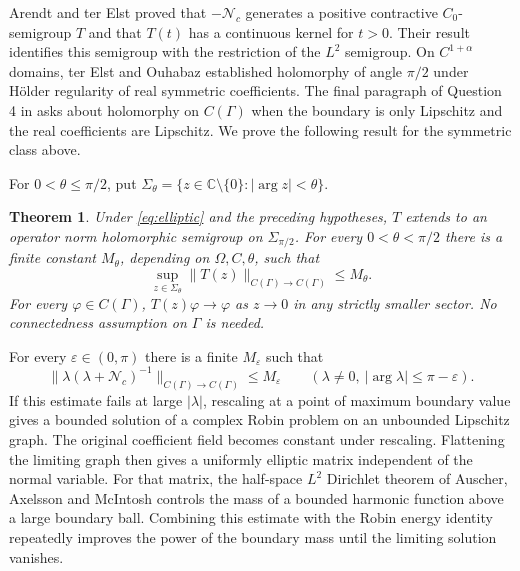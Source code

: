 \documentclass[11pt]{article}
\newtheorem{theorem}{Theorem}[section]
\newcommand{\C}{\mathbb C}
\newcommand{\Nc}{\mathcal N_c}
\newcommand{\norm}[1]{\lVert #1\rVert}
\newcommand{\abs}[1]{\lvert #1\rvert}
\begin{document}
Arendt and ter Elst \cite{ArendtElst} proved that $-\Nc$ generates a positive
contractive $C_0$-semigroup $T$ and that $T(t)$ has a continuous kernel for
$t>0$. Their result identifies this semigroup with the restriction of the
$L^2$ semigroup. On $C^{1+\alpha}$ domains, ter Elst and Ouhabaz
\cite{ElstOuhabazAnalytic} established holomorphy of angle $\pi/2$ under
H\"older regularity of real symmetric coefficients. The final paragraph of
Question 4 in \cite{OpenProblems} asks about holomorphy on $C(\Gamma)$ when
the boundary is only Lipschitz and the real coefficients are Lipschitz.
We prove the following result for the symmetric class above.

For $0<\theta\leq\pi/2$, put
$\Sigma_\theta=\{z\in\C\setminus\{0\}:\abs{\arg z}<\theta\}$.

\begin{theorem}\label{thm:main}
Under \eqref{eq:elliptic} and the preceding hypotheses, $T$ extends to an
operator norm holomorphic semigroup on $\Sigma_{\pi/2}$. For every
$0<\theta<\pi/2$ there is a finite constant $M_\theta$, depending on
$\Omega,C,\theta$, such that
\begin{equation}\label{eq:sectorT}
 \sup_{z\in\Sigma_\theta}\norm{T(z)}_{C(\Gamma)\to C(\Gamma)}\leq M_\theta.
\end{equation}
For every $\varphi\in C(\Gamma)$, $T(z)\varphi\to\varphi$ as $z\to0$ in any
strictly smaller sector. No connectedness assumption on $\Gamma$ is needed.
\end{theorem}

For every $\varepsilon\in(0,\pi)$ there is a finite $M_\varepsilon$ such that
\begin{equation}\label{eq:mainres}
 \norm{\lambda(\lambda+\Nc)^{-1}}_{C(\Gamma)\to C(\Gamma)}
 \leq M_\varepsilon
 \qquad(\lambda\neq0,\ \abs{\arg\lambda}\leq\pi-\varepsilon).
\end{equation}
If this estimate fails at large $\abs\lambda$, rescaling at a point of
maximum boundary value gives a bounded solution of a complex Robin problem
on an unbounded Lipschitz graph. The original coefficient field becomes
constant under rescaling. Flattening the limiting graph then gives a
uniformly elliptic matrix independent of the normal variable. For that
matrix, the half-space $L^2$ Dirichlet theorem of
Auscher, Axelsson and McIntosh \cite{AAM} controls the mass of a bounded
harmonic function above a large boundary ball. Combining this estimate with
the Robin energy identity repeatedly improves the power of the boundary
mass until the limiting solution vanishes.
\end{document}
